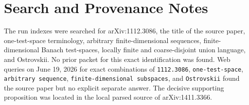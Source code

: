 \documentclass[11pt]{amsart}
\begin{document}
\section*{Search and Provenance Notes}

The run indexes were searched for arXiv:1112.3086, the title of the source
paper, one-test-space terminology, arbitrary finite-dimensional sequences,
finite-dimensional Banach test-spaces, locally finite and coarse-disjoint
union language, and Ostrovskii. No prior packet for this exact identification
was found. Web queries on June 19, 2026 for exact combinations of
\texttt{1112.3086}, \texttt{one-test-space}, \texttt{arbitrary sequence},
\texttt{finite-dimensional subspaces}, and \texttt{Ostrovskii} found the
source paper but no explicit separate answer. The decisive supporting
proposition was located in the local parsed source of arXiv:1411.3366.
\end{document}
